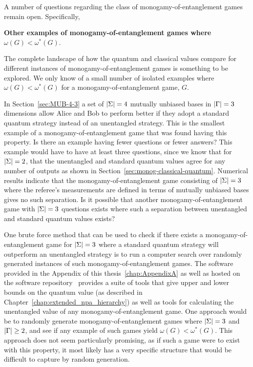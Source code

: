 A number of questions regarding the class of monogamy-of-entanglement games remain open. Specifically, 

\begin{question}
	{\bf Other examples of monogamy-of-entanglement games where $\omega(G) < \omega^*(G)$}.
\end{question}

	The complete landscape of how the quantum and classical values compare for different instances of monogamy-of-entanglement games is something to be explored. We only know of a small number of isolated examples where $\omega(G) < \omega^*(G)$ for a monogamy-of-entanglement game, $G$. 

	In Section~\ref{sec:MUB-4-3} a set of $\left\lvert \Sigma \right\rvert = 4$ mutually unbiased bases in $\left\lvert \Gamma \right\rvert = 3$ dimensions allow Alice and Bob to perform better if they adopt a standard quantum strategy instead of an unentangled strategy. This is the smallest example of a monogamy-of-entanglement game that was found having this property. Is there an example having fewer questions or fewer answers? This example would have to have at least three questions, since we know that for $\left\lvert \Sigma \right\rvert = 2$, that the unentangled and standard quantum values agree for any number of outputs as shown in Section~\ref{sec:monog-classical-quantum}. Numerical results indicate that the monogamy-of-entanglement game consisting of $\left\lvert \Sigma \right\rvert = 3$ where the referee's measurements are defined in terms of mutually unbiased bases gives no such separation. Is it possible that another monogamy-of-entanglement game with $\left\lvert \Sigma \right\rvert = 3$ questions exists where such a separation between unentangled and standard quantum values exists? 

	One brute force method that can be used to check if there exists a monogamy-of-entanglement game for $\left\lvert \Sigma \right\rvert = 3$ where a standard quantum strategy will outperform an unentangled strategy is to run a computer search over randomly generated instances of such monogamy-of-entanglement games. The software provided in the Appendix of this thesis~\ref{chap:AppendixA} as well as hosted on the software repository~\cite{Russo2015a} provides a suite of tools that give upper and lower bounds on the quantum value (as described in Chapter~\ref{chap:extended_npa_hierarchy}) as well as tools for calculating the unentangled value of any monogamy-of-entanglement game. One approach would be to randomly generate monogamy-of-entanglement games where $\left\lvert \Sigma \right\rvert = 3$ and $\left\lvert \Gamma \right\rvert \geq 2$, and see if any example of such games yield $\omega(G) < \omega^*(G)$. This approach does not seem particularly promising, as if such a game were to exist with this property, it most likely has a very specific structure that would be difficult to capture by random generation.
	

